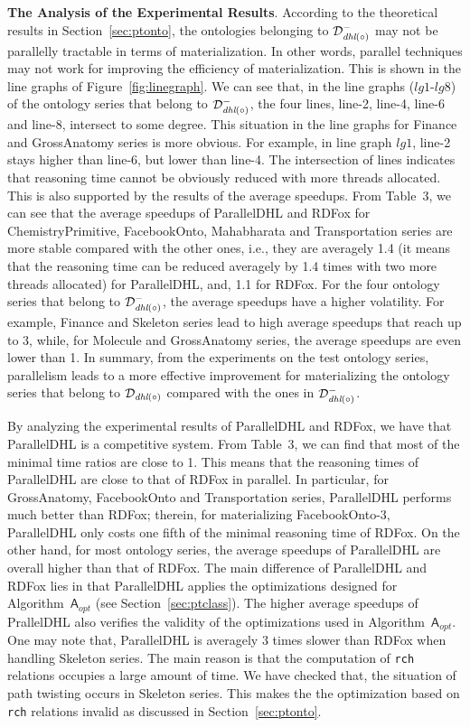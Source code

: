 \documentclass[final,1p,times]{elsarticle}
\begin{document}
\textbf{The Analysis of the Experimental Results}.
According to the theoretical results in Section~\ref{sec:ptonto}, the ontologies belonging to $\mathcal{D}^-_{\textit{\text{dhl}}(\circ)}$
may not be parallelly tractable in terms of materialization. In other words,
parallel techniques may not work for improving the efficiency of materialization.
This is shown in the line graphs of Figure~\ref{fig:linegraph}.
We can see that, in the line graphs ($lg1$-$lg8$) of the ontology series
that belong to $\mathcal{D}^-_{\textit{\text{dhl}}(\circ)}$, the four lines, line-2, line-4, line-6 and line-8,
intersect to some degree. This situation in the line graphs for Finance and GrossAnatomy
series is more obvious. For example, in line graph $lg1$,
line-2 stays higher than line-6, but lower than line-4.
The intersection of lines indicates that reasoning time cannot be obviously reduced with more threads allocated.
This is also supported by the results of the average speedups.
From Table~3, we can see that the average speedups of ParallelDHL and RDFox
for ChemistryPrimitive, FacebookOnto, Mahabharata and Transportation series
are more stable compared with the other ones, i.e., they are averagely 1.4
(it means that the reasoning time can be reduced averagely by 1.4 times with two more threads allocated)
for ParallelDHL, and, 1.1 for RDFox. For the four ontology series that belong to $\mathcal{D}^-_{\textit{\text{dhl}}(\circ)}$,
the average speedups have a higher volatility. For example,
Finance and Skeleton series lead to high average speedups that reach up to 3,
while, for Molecule and GrossAnatomy series, the average speedups are even lower than 1.
In summary, from the experiments on the test ontology series,
parallelism leads to a more effective improvement for materializing the ontology series
that belong to $\mathcal{D}_{\textit{\text{dhl}}(\circ)}$ compared with the ones in $\mathcal{D}^-_{\textit{\text{dhl}}(\circ)}$.

By analyzing the experimental results of ParallelDHL and RDFox, we have that
ParallelDHL is a competitive system.
From Table~3, we can find that most of the minimal time ratios are close to 1.
This means that the reasoning times of ParallelDHL are close to that of RDFox in parallel.
In particular, for GrossAnatomy, FacebookOnto and Transportation series, ParallelDHL performs
much better than RDFox; therein, for materializing FacebookOnto-3, ParallelDHL
only costs one fifth of the minimal reasoning time of RDFox.
On the other hand, for most ontology series,
the average speedups of ParallelDHL are overall higher than that of RDFox.
The main difference of ParallelDHL and RDFox lies in that ParallelDHL applies
the optimizations designed for Algorithm~$\mathsf{A}_{opt}$ (see Section~\ref{sec:ptclass}).
The higher average speedups of PrallelDHL also verifies the validity of the optimizations
used in Algorithm~$\mathsf{A}_{opt}$.
One may note that, ParallelDHL is averagely 3 times slower than RDFox when handling Skeleton series.
The main reason is that the computation of \texttt{rch} relations
occupies a large amount of time. We have checked that, the situation of path twisting occurs in Skeleton series.
This makes the the optimization based on \texttt{rch} relations invalid as discussed
in Section~\ref{sec:ptonto}.
\end{document}
